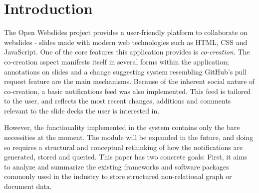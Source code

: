 \documentclass[fleqn,10pt]{voorstel}
\affiliation{\textbf{Contact:} \href{mailto:florian@floriandejonckheere.be}{florian@floriandejonckheere.be}}
\begin{document}
\flushbottom %
\maketitle %
\tableofcontents %
\thispagestyle{empty} %



\section{Introduction} %
\label{sec:introduction}


The Open Webslides project \autocite{OpenWebslides} provides a user-friendly platform to collaborate on webslides - slides made with modern web technologies such as HTML, CSS and JavaScript. One of the core features this application provides is \emph{co-creation}. The co-creation aspect manifests itself in several forms within the application; annotations on slides and a change suggesting system resembling GitHub's pull request feature are the main mechanisms. Because of the inherent social nature of co-creation, a basic notifications feed was also implemented. This feed is tailored to the user, and reflects the most recent changes, additions and comments relevant to the slide decks the user is interested in.

However, the functionality implemented in the system contains only the bare necessities at the moment. The module will be expanded in the future, and doing so requires a structural and conceptual rethinking of how the notifications are generated, stored and queried. This paper has two concrete goals: First, it aims to analyze and summarize the existing frameworks and software packages commonly used in the industry to store structured non-relational graph or document data.
\end{document}
